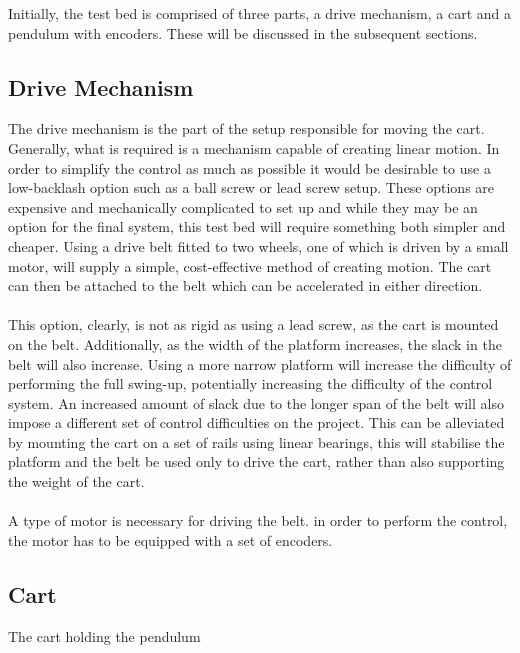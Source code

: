 Initially, the test bed is comprised of three parts, a drive mechanism, a cart and a pendulum with encoders.
These will be discussed in the subsequent sections.

\subsection{Drive Mechanism} %
\label{sub:drive_mechanism}
The drive mechanism is the part of the setup responsible for moving the cart.
Generally, what is required is a mechanism capable of creating linear motion.
In order to simplify the control as much as possible it would be desirable to use a low-backlash option such as a ball screw or lead screw setup.
These options are expensive and mechanically complicated to set up and while they may be an option for the final system, this test bed will require something both simpler and cheaper.
Using a drive belt fitted to two wheels, one of which is driven by a small motor, will supply a simple, cost-effective method of creating motion.
The cart can then be attached to the belt which can be accelerated in either direction.
\\~\\
This option, clearly, is not as rigid as using a lead screw, as the cart is mounted on the belt.
Additionally, as the width of the platform increases, the slack in the belt will also increase.
Using a more narrow platform will increase the difficulty of performing the full swing-up, potentially increasing the difficulty of the control system.
An increased amount of slack due to the longer span of the belt will also impose a different set of control difficulties on the project.
This can be alleviated by mounting the cart on a set of rails using linear bearings, this will stabilise the platform and the belt be used only to drive the cart, rather than also supporting the weight of the cart.
\\~\\
A type of motor is necessary for driving the belt.
in order to perform the control, the motor has to be equipped with a set of encoders.

\subsection{Cart} %
\label{sub:cart}
The cart holding the pendulum 

